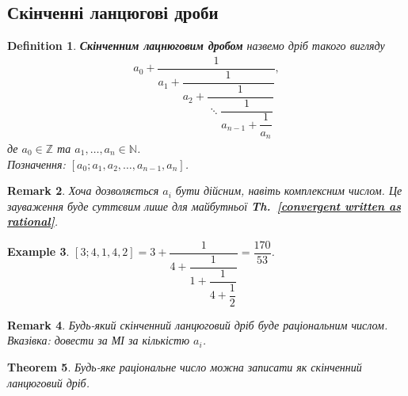 \documentclass[a4paper, 10pt]{article}
\theoremstyle{theoremdd}
\newtheorem{theorem}{Theorem}[subsection]
\theoremstyle{theoremdd}
\newtheorem{definition}[theorem]{Definition}
\theoremstyle{theoremdd}
\theoremstyle{theoremdd}
\newtheorem{example}[theorem]{Example}
\theoremstyle{theoremdd}
\theoremstyle{theoremdd}
\newtheorem{remark}[theorem]{Remark}
\theoremstyle{theoremdd}
\theoremstyle{theoremdd}
\newcommand\thref[1]{\textbf{Th.~\ref{#1}}}
\begin{document}
\subsection{Скінченні ланцюгові дроби}
\begin{definition}
\textbf{Скінченним лацнюговим дробом} назвемо дріб такого вигляду
\begin{align*}
a_0 + \dfrac{1}{a_1 + \dfrac{1}{a_2 + \dfrac{1}{\ddots \dfrac{1}{a_{n-1} + \dfrac{1}{a_{n}}} }}},
\end{align*}
де $a_0 \in \mathbb{Z}$ та $a_1,\dots,a_n \in \mathbb{N}$.\\
Позначення: $[a_0;a_1,a_2,\dots,a_{n-1},a_n]$.
\end{definition}

\begin{remark}
\label{continued frac can have not only integers}
Хоча дозволяється $a_i$ бути дійсним, навіть комплексним числом. Це зауваження буде суттєвим лише для майбутньої \thref{convergent written as rational}.
\end{remark}

\begin{example}
$[3;4,1,4,2] = 3 + \dfrac{1}{4 + \dfrac{1}{1 + \dfrac{1}{4 + \dfrac{1}{2}}}} = \dfrac{170}{53}$.
\end{example}

\begin{remark}
Будь-який скінченний ланцюговий дріб буде раціональним числом.\\
\textit{Вказівка: довести за МІ за кількістю $a_i$.}
\end{remark}

\begin{theorem}
Будь-яке раціональне число можна записати як скінченний ланцюговий дріб.
\end{theorem}
\end{document}
